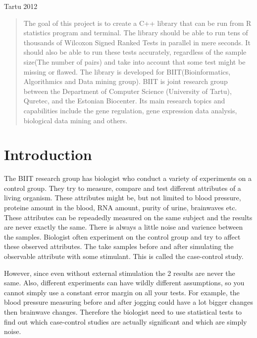 \documentclass[12pt]{article}
\begin{document}
\vfill
\centerline{Tartu 2012}

\newpage

\tableofcontents

\pagebreak

\begin{abstract}
The goal of this project is to create a C++ library that can be run from R statistics program and terminal. The library should be able to run tens of thousands of Wilcoxon Signed Ranked Tests in parallel in mere seconds. It should also be able to run these tests accurately, regardless of the sample size(The number of pairs) and take into account that some test might be missing or flawed. The library is developed for BIIT(Bioinformatics, Algorithmics and Data mining group). BIIT is joint research group between the Department of Computer Science (University of Tartu), Quretec, and the Estonian Biocenter. Its main research topics and capabilities include the gene regulation, gene expression data analysis, biological data mining and others.
\end{abstract}

\newpage

\section{Introduction}
The BIIT research group has biologist who conduct a variety of experiments on a control group. They try to measure, compare and test different attributes of a living organism. These attributes might be, but not limited to blood pressure, proteine amount in the blood, RNA amount, purity of urine, brainwaves etc. These attributes can be repeadedly measured on the same subject and the results are never exactly the same. There is always a little noise and varience between the samples. Biologist often experiment on the control group and try to affect these observed attributes. The take samples before and after simulating the observable attribute with some stimulant. This is called the case-control study.

However, since even without external stimulation the 2 results are never the same. Also, different experiments can have wildly different assumptions, so you cannot simply use a constant error margin on all your tests. For example, the blood pressure measuring before and after jogging could have a lot bigger changes then brainwave changes.  Therefore  the biologist need to use statistical tests to find out which case-control studies are actually significant and which are simply noise.
\end{document}
